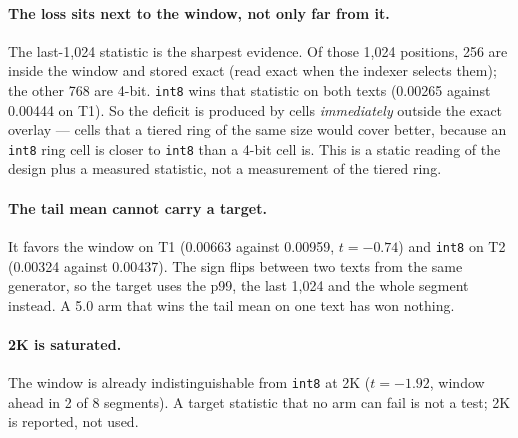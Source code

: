 \documentclass[10pt,twocolumn]{article}
\begin{document}
\paragraph{The loss sits next to the window, not only far from it.} The last-1,024 statistic is the sharpest evidence. Of those 1,024 positions, 256 are inside the window and stored exact (read exact when the indexer selects them); the other 768 are 4-bit. \texttt{int8} wins that statistic on both texts (0.00265 against 0.00444 on T1). So the deficit is produced by cells \emph{immediately} outside the exact overlay --- cells that a tiered ring of the same size would cover better, because an \texttt{int8} ring cell is closer to \texttt{int8} than a 4-bit cell is. This is a static reading of the design plus a measured statistic, not a measurement of the tiered ring.

\paragraph{The tail mean cannot carry a target.} It favors the window on T1 (0.00663 against 0.00959, $t{=}-0.74$) and \texttt{int8} on T2 (0.00324 against 0.00437). The sign flips between two texts from the same generator, so the target uses the p99, the last 1,024 and the whole segment instead. A 5.0 arm that wins the tail mean on one text has won nothing.

\paragraph{2K is saturated.} The window is already indistinguishable from \texttt{int8} at 2K ($t{=}-1.92$, window ahead in 2 of 8 segments). A target statistic that no arm can fail is not a test; 2K is reported, not used.
\end{document}
